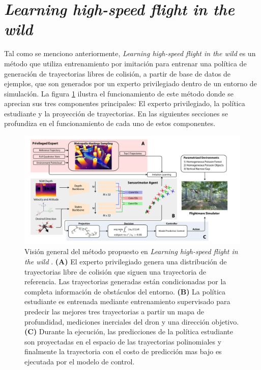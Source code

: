 \section{\textit{Learning high-speed flight in the wild}}

\label{sec::prev-agile-autonomy}

Tal como se menciono anteriormente, \textit{Learning high-speed flight in the wild} \cite{Loquercio2021} es un método que utiliza entrenamiento por imitación para entrenar una política de generación de trayectorias libres de colisión, a partir de base de datos de ejemplos, que son generados por un experto privilegiado dentro de un entorno de simulación. La figura \ref{fig:prev-agile-autonomy-overview} ilustra el funcionamiento de este método donde se aprecian sus tres componentes principales: El experto privilegiado, la política estudiante y la proyección de trayectorias. En las siguientes secciones se profundiza en el funcionamiento de cada uno de estos componentes.

\begin{figure}[H]
    \centering
    \includegraphics[scale=0.3]{partes/img/agile-autonomy-overview.png}
    \caption[Visión general del método propuesto en \textit{Learning high-speed flight in the wild}]{Visión general del método propuesto en \textit{Learning high-speed flight in the wild} \cite{Loquercio2021}. \textbf{(A)} El experto privilegiado genera una distribución de trayectorias libre de colisión que siguen una trayectoria de referencia. Las trayectorias generadas están condicionadas por la completa información de obstáculos del entorno. \textbf{(B)} La política estudiante es entrenada mediante entrenamiento supervisado para predecir las mejores tres trayectorias a partir un mapa de profundidad, mediciones inerciales del dron y una dirección objetivo. \textbf{(C)} Durante la ejecución, las predicciones de la política estudiante son proyectadas en el espacio de las trayectorias polinomiales y finalmente la trayectoria con el costo de predicción mas bajo es ejecutada por el modelo de control. }
    \label{fig:prev-agile-autonomy-overview}
\end{figure}

